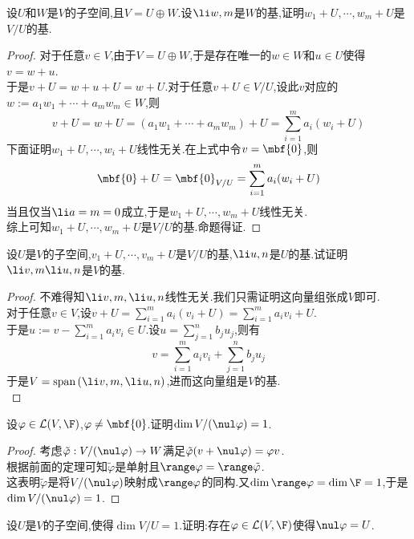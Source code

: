 \documentclass{ctexart}
\begin{document}
\begin{problem}[14.]
    设$U$和$W$是$V$的子空间,且$V=U\oplus W$.设$\li w,m$是$W$的基,证明$w_1+U,\cdots,w_m+U$是$V/U$的基.
\end{problem}
\begin{proof}
    对于任意$v\in V$,由于$V=U\oplus W$,于是存在唯一的$w\in W$和$u\in U$使得$v=w+u$.\\
    于是$v+U=w+u+U=w+U$.对于任意$v+U\in V/U$,设此$v$对应的$w:=a_1w_1+\cdots+a_mw_m\in W$,则
    $$v+U=w+U=(a_1w_1+\cdots+a_mw_m)+U=\sum_{i=1}^{m}a_i(w_i+U)$$
    下面证明$w_1+U,\cdots,w_i+U$线性无关.在上式中令$v=\mbf{0}$,则
    $$\mbf{0}+U=\mbf{0}_{V/U}=\sum_{i=1}^{m}a_i(w_i+U)$$
    当且仅当$\li a=m=0$成立,于是$w_1+U,\cdots,w_m+U$线性无关.\\
    综上可知$w_1+U,\cdots,w_m+U$是$V/U$的基.命题得证.
\end{proof}
\begin{problem}[15.]
    设$U$是$V$的子空间,$v_1+U,\cdots,v_m+U$是$V/U$的基,$\li u,n$是$U$的基.试证明$\li v,m\li u,n$是$V$的基.
\end{problem}
\begin{proof}
    不难得知$\li v,m,\li u,n$线性无关.我们只需证明这向量组张成$V$即可.\\
    对于任意$v\in V$,设$\displaystyle v+U=\sum_{i=1}^{m}a_i(v_i+U)=\sum_{i=1}^ma_iv_i+U$.\\
    于是$u:=\displaystyle v-\sum_{i=1}^ma_iv_i\in U$.设$u=\sum_{j=1}^{n}b_ju_j$,则有
    $$v=\sum_{i=1}^ma_iv_i+\sum_{j=1}^nb_ju_j$$
    于是$V=\text{span}\left(\li v,m,\li u,n\right)$,进而这向量组是$V$的基.\\
\end{proof}
\begin{problem}[16.]
    设$\varphi\in\mathcal{L}(V,\F)$,$\varphi\neq\mbf{0}$.证明$\dim V/(\nul\varphi)=1$.
\end{problem}
\begin{proof}
    考虑$\tilde{\varphi}:V/(\nul\varphi)\to W$满足$\tilde{\varphi}(v+\nul\varphi)=\varphi v$.\\
    根据前面的定理可知$\tilde{\varphi}$是单射且$\range\varphi=\range\tilde{\varphi}$.\\
    这表明$\tilde{\varphi}$是将$V/(\nul\varphi)$映射成$\range\varphi$的同构.又$\dim\range\varphi=\dim\F=1$,于是$\dim V/(\nul\varphi)=1$.
\end{proof}
\begin{problem}[17.]
    设$U$是$V$的子空间,使得$\dim V/U=1$.证明:存在$\varphi\in\mathcal{L}(V,\F)$使得$\nul\varphi=U$.
\end{problem}
\end{document}
